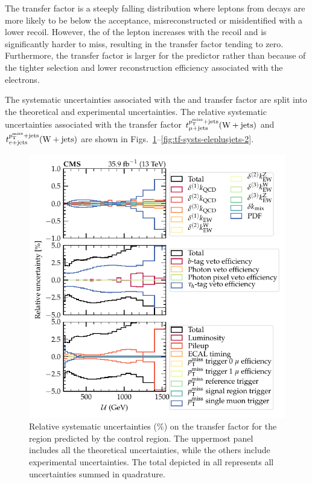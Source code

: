 The transfer factor is a steeply falling distribution where leptons from \PW decays are more likely to be below the \pt acceptance, misreconstructed or misidentified with a lower recoil. However, the \pt of the lepton increases with the recoil and is significantly harder to miss, resulting in the transfer factor tending to zero. Furthermore, the transfer factor is larger for the \eleplusjets predictor rather than \muplusjets because of the tighter selection and lower reconstruction efficiency associated with the electrons.

The systematic uncertainties associated with the \muplusjets and \eleplusjets transfer factor are split into the theoretical and experimental uncertainties. The relative systematic uncertainties associated with the transfer factor $t_{\mu+\mathrm{jets}}^{p_{\text{T}}^{\mathrm{miss}}+\mathrm{jets}}({\mathrm{W}+\mathrm{jets}})$ and $t_{e+\mathrm{jets}}^{p_{\text{T}}^{\mathrm{miss}}+\mathrm{jets}}({\mathrm{W}+\mathrm{jets}})$ are shown in Figs.~\ref{fig:tf-systs-muplusjets-1}--\ref{fig:tf-systs-eleplusjets-2}.
%
\begin{figure}
    \centering
    \includegraphics{chapters/042_backgrounds/images/tf_wj_mu_met_systs1.pdf}
    \caption[Theoretical uncertainty on the transfer factors]{
        Relative systematic uncertainties (\%) on the \IWj transfer factor for the \metplusjets region predicted by the \muplusjets control region. The uppermost panel includes all the theoretical uncertainties, while the others include experimental uncertainties. The total depicted in all represents all uncertainties summed in quadrature.
    }
    \label{fig:tf-systs-muplusjets-1}
\end{figure}
